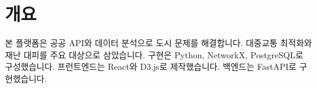 \section{개요}

본 플랫폼은 공공 API와 데이터 분석으로 도시 문제를 해결합니다.
대중교통 최적화와 재난 대피를 주요 대상으로 삼았습니다.
구현은 Python, NetworkX, PostgreSQL로 구성했습니다.
프런트엔드는 React와 D3.js로 제작했습니다.
백엔드는 FastAPI로 구현했습니다.

